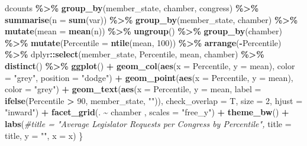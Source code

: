 \documentclass[
]{article}
\newenvironment{Shaded}{\begin{snugshade}}{\end{snugshade}}
\newcommand{\CommentTok}[1]{\textcolor[rgb]{0.56,0.35,0.01}{\textit{#1}}}
\newcommand{\DataTypeTok}[1]{\textcolor[rgb]{0.13,0.29,0.53}{#1}}
\newcommand{\DecValTok}[1]{\textcolor[rgb]{0.00,0.00,0.81}{#1}}
\newcommand{\KeywordTok}[1]{\textcolor[rgb]{0.13,0.29,0.53}{\textbf{#1}}}
\newcommand{\NormalTok}[1]{#1}
\newcommand{\OperatorTok}[1]{\textcolor[rgb]{0.81,0.36,0.00}{\textbf{#1}}}
\newcommand{\StringTok}[1]{\textcolor[rgb]{0.31,0.60,0.02}{#1}}
\begin{document}
\begin{Shaded}
\begin{Highlighting}[]
\NormalTok{  dcounts }\OperatorTok{\%\textgreater{}\%}
\StringTok{      }\KeywordTok{group\_by}\NormalTok{(member\_state, chamber, congress) }\OperatorTok{\%\textgreater{}\%}\StringTok{ }\KeywordTok{summarise}\NormalTok{(}\DataTypeTok{n =} \KeywordTok{sum}\NormalTok{(var)) }\OperatorTok{\%\textgreater{}\%}
\StringTok{      }\KeywordTok{group\_by}\NormalTok{(member\_state, chamber) }\OperatorTok{\%\textgreater{}\%}\StringTok{ }\KeywordTok{mutate}\NormalTok{(}\DataTypeTok{mean =} \KeywordTok{mean}\NormalTok{(n)) }\OperatorTok{\%\textgreater{}\%}\StringTok{ }\KeywordTok{ungroup}\NormalTok{() }\OperatorTok{\%\textgreater{}\%}\StringTok{ }
\StringTok{      }\KeywordTok{group\_by}\NormalTok{(chamber) }\OperatorTok{\%\textgreater{}\%}\StringTok{ }\KeywordTok{mutate}\NormalTok{(}\DataTypeTok{Percentile =} \KeywordTok{ntile}\NormalTok{(mean, }\DecValTok{100}\NormalTok{)) }\OperatorTok{\%\textgreater{}\%}\StringTok{ }
\StringTok{    }\KeywordTok{arrange}\NormalTok{(}\OperatorTok{{-}}\NormalTok{Percentile) }\OperatorTok{\%\textgreater{}\%}\StringTok{ }
\StringTok{    }\NormalTok{dplyr}\OperatorTok{::}\KeywordTok{select}\NormalTok{(member\_state, Percentile, mean, chamber) }\OperatorTok{\%\textgreater{}\%}\StringTok{ }\KeywordTok{distinct}\NormalTok{() }\OperatorTok{\%\textgreater{}\%}\StringTok{ }
\StringTok{      }\KeywordTok{ggplot}\NormalTok{() }\OperatorTok{+}\StringTok{ }
\StringTok{      }\KeywordTok{geom\_col}\NormalTok{(}\KeywordTok{aes}\NormalTok{(}\DataTypeTok{x =}\NormalTok{ Percentile, }\DataTypeTok{y =}\NormalTok{ mean), }\DataTypeTok{color =} \StringTok{"grey"}\NormalTok{, }\DataTypeTok{position =} \StringTok{"dodge"}\NormalTok{) }\OperatorTok{+}\StringTok{ }
\StringTok{    }\KeywordTok{geom\_point}\NormalTok{(}\KeywordTok{aes}\NormalTok{(}\DataTypeTok{x =}\NormalTok{ Percentile, }\DataTypeTok{y =}\NormalTok{ mean), }\DataTypeTok{color =} \StringTok{"grey"}\NormalTok{) }\OperatorTok{+}\StringTok{ }
\StringTok{    }\KeywordTok{geom\_text}\NormalTok{(}\KeywordTok{aes}\NormalTok{(}\DataTypeTok{x =}\NormalTok{ Percentile, }\DataTypeTok{y =}\NormalTok{ mean, }\DataTypeTok{label =} \KeywordTok{ifelse}\NormalTok{(Percentile }\OperatorTok{\textgreater{}}\StringTok{ }\DecValTok{90}\NormalTok{, member\_state, }\StringTok{""}\NormalTok{)), }\DataTypeTok{check\_overlap =}\NormalTok{ T, }\DataTypeTok{size =} \DecValTok{2}\NormalTok{, }\DataTypeTok{hjust =} \StringTok{"inward"}\NormalTok{) }\OperatorTok{+}\StringTok{ }
\StringTok{      }\KeywordTok{facet\_grid}\NormalTok{(. }\OperatorTok{\textasciitilde{}}\StringTok{ }\NormalTok{chamber , }\DataTypeTok{scales =} \StringTok{"free\_y"}\NormalTok{) }\OperatorTok{+}\StringTok{ }\KeywordTok{theme\_bw}\NormalTok{() }\OperatorTok{+}
\StringTok{    }\KeywordTok{labs}\NormalTok{(}\CommentTok{\#title = "Average Legislator Requests per Congress by Percentile",}
      \DataTypeTok{title =}\NormalTok{ title,}
         \DataTypeTok{y =} \StringTok{""}\NormalTok{,}
         \DataTypeTok{x =}\NormalTok{ x)}
\NormalTok{\}}



\end{Highlighting}
\end{Shaded}
\end{document}
